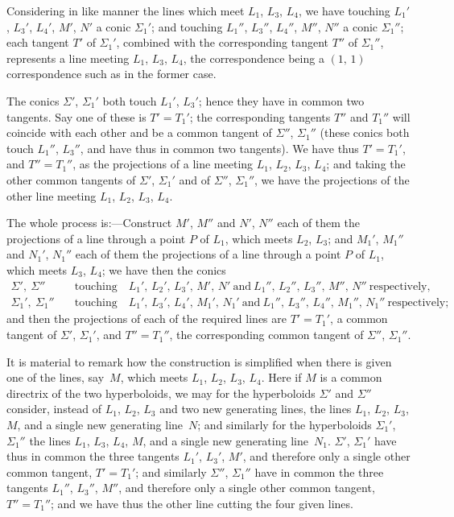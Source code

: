 \documentclass[11pt,a4paper]{article}
\theoremstyle{plain}
\theoremstyle{definition}
\begin{document}
Considering in like manner the lines which meet $L_1$, $L_3$, $L_4$, we have touching
$L_1'$, $L_3'$, $L_4'$, $M'$, $N'$ a conic $\Sigma_1'$; and touching $L_1''$, $L_3''$, $L_4''$, $M''$, $N''$ a conic $\Sigma_1''$; each
tangent $T'$ of $\Sigma_1'$, combined with the corresponding tangent $T''$ of $\Sigma_1''$, represents a line
meeting $L_1$, $L_3$, $L_4$, the correspondence being a $(1,\,1)$ correspondence such as in the
former case.

The conics $\Sigma'$, $\Sigma_1'$ both touch $L_1'$, $L_3'$; hence they have in common two tangents.
Say one of these is $T' = T_1'$; the corresponding tangents $T''$ and $T_1''$ will coincide
with each other and be a common tangent of $\Sigma''$, $\Sigma_1''$ (these conics both touch $L_1''$, $L_3''$,
and have thus in common two tangents).  We have thus $T' = T_1'$, and $T'' = T_1''$, as the
projections of a line meeting $L_1$, $L_2$, $L_3$, $L_4$; and taking the other common tangents
of $\Sigma'$, $\Sigma_1'$ and of $\Sigma''$, $\Sigma_1''$, we have the projections of the other line meeting $L_1$, $L_2$, $L_3$, $L_4$.

The whole process is:---Construct $M'$, $M''$ and $N'$, $N''$ each of them the projections
of a line through a point $P$ of $L_1$, which meets $L_2$, $L_3$; and $M_1'$, $M_1''$ and $N_1'$, $N_1''$ each
of them the projections of a line through a point $P$ of $L_1$, which meets $L_3$, $L_4$; we
have then the conics
\begin{align*}
\Sigma',\ \Sigma''\quad &\text{touching}\quad L_1',\,L_2',\,L_3',\,M',\,N'\ \text{and}\ L_1'',\,L_2'',\,L_3'',\,M'',\,N''\ \text{respectively}, \\
\Sigma_1',\ \Sigma_1''\quad &\text{touching}\quad L_1',\,L_3',\,L_4',\,M_1',\,N_1'\ \text{and}\ L_1'',\,L_3'',\,L_4'',\,M_1'',\,N_1''\ \text{respectively};
\end{align*}
and then the projections of each of the required lines are $T' = T_1'$, a common tangent
of $\Sigma'$, $\Sigma_1'$, and $T'' = T_1''$, the corresponding common tangent of $\Sigma''$, $\Sigma_1''$.

It is material to remark how the construction is simplified when there is given
one of the lines, say~$M$, which meets $L_1$, $L_2$, $L_3$, $L_4$.  Here if $M$ is a common directrix
of the two hyperboloids, we may for the hyperboloids $\Sigma'$ and $\Sigma''$ consider, instead of
$L_1$, $L_2$, $L_3$ and two new generating lines, the lines $L_1$, $L_2$, $L_3$, $M$, and a single new
generating line~$N$; and similarly for the hyperboloids $\Sigma_1'$, $\Sigma_1''$ the lines $L_1$, $L_3$, $L_4$, $M$, and
a single new generating line~$N_1$.  $\Sigma'$, $\Sigma_1'$ have thus in common the three tangents
$L_1'$, $L_3'$, $M'$, and therefore only a single other common tangent, $T' = T_1'$; and similarly
$\Sigma''$, $\Sigma_1''$ have in common the three tangents $L_1''$, $L_3''$, $M''$, and therefore only a single
other common tangent, $T'' = T_1''$; and we have thus the other line cutting the four
given lines.
\end{document}
